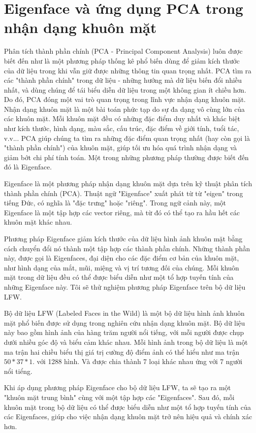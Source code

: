 \documentclass[12pt,a4paper,oneside]{report}
\numberwithin{equation}{section}
\begin{document}
\section{Eigenface và ứng dụng PCA trong nhận dạng khuôn mặt}
Phân tích thành phần chính (PCA - Principal Component Analysis) luôn được biết đến như là một phương pháp thống kê phổ biến dùng để giảm kích thước của dữ liệu trong khi vẫn giữ được những thông tin quan trọng nhất. PCA tìm ra các "thành phần chính" trong dữ liệu - những hướng mà dữ liệu biến đổi nhiều nhất, và dùng chúng để tái biểu diễn dữ liệu trong một không gian ít chiều hơn. Do đó, PCA đóng một vai trò quan trọng trong lĩnh vực nhận dạng khuôn mặt. Nhận dạng khuôn mặt là một bài toán phức tạp do sự đa dạng vô cùng lớn của các khuôn mặt. Mỗi khuôn mặt đều có những đặc điểm duy nhất và khác biệt như kích thước, hình dạng, màu sắc, cấu trúc, đặc điểm về giới tính, tuổi tác, v.v... PCA giúp chúng ta tìm ra những đặc điểm quan trọng nhất (hay còn gọi là "thành phần chính") của khuôn mặt, giúp tối ưu hóa quá trình nhận dạng và giảm bớt chi phí tính toán. Một trong những phương pháp thường được biết đến đó là Eigenface.

Eigenface là một phương pháp nhận dạng khuôn mặt dựa trên kỹ thuật phân tích thành phần chính (PCA). Thuật ngữ "Eigenface" xuất phát từ từ "eigen" trong tiếng Đức, có nghĩa là "đặc trưng" hoặc "riêng". Trong ngữ cảnh này, một Eigenface là một tập hợp các vector riêng, mà từ đó có thể tạo ra hầu hết các khuôn mặt khác nhau.

Phương pháp Eigenface giảm kích thước của dữ liệu hình ảnh khuôn mặt bằng cách chuyển đổi nó thành một tập hợp các thành phần chính. Những thành phần này, được gọi là Eigenfaces, đại diện cho các đặc điểm cơ bản của khuôn mặt, như hình dạng của mắt, mũi, miệng và vị trí tương đối của chúng. Mỗi khuôn mặt trong dữ liệu đều có thể được biểu diễn như một tổ hợp tuyến tính của những Eigenface này. Tôi sẽ thử nghiệm phương pháp Eigenface trên bộ dữ liệu LFW.

Bộ dữ liệu LFW (Labeled Faces in the Wild) là một bộ dữ liệu hình ảnh khuôn mặt phổ biến được sử dụng trong nghiên cứu nhận dạng khuôn mặt. Bộ dữ liệu này bao gồm hình ảnh của hàng trăm người nổi tiếng, với mỗi người được chụp dưới nhiều góc độ và biểu cảm khác nhau. Mỗi hình ảnh trong bộ dữ liệu là một ma trận hai chiều biểu thị giá trị cường độ điểm ảnh có thể hiểu như ma trận $50*37*1$. với 1288 hình. Và được chia thành 7 loại khác nhau ứng với 7 người nổi tiểng.

Khi áp dụng phương pháp Eigenface cho bộ dữ liệu LFW, ta sẽ tạo ra một "khuôn mặt trung bình" cùng với một tập hợp các "Eigenfaces". Sau đó, mỗi khuôn mặt trong bộ dữ liệu có thể được biểu diễn như một tổ hợp tuyến tính của các Eigenfaces, giúp cho việc nhận dạng khuôn mặt trở nên hiệu quả và chính xác hơn.
\end{document}

